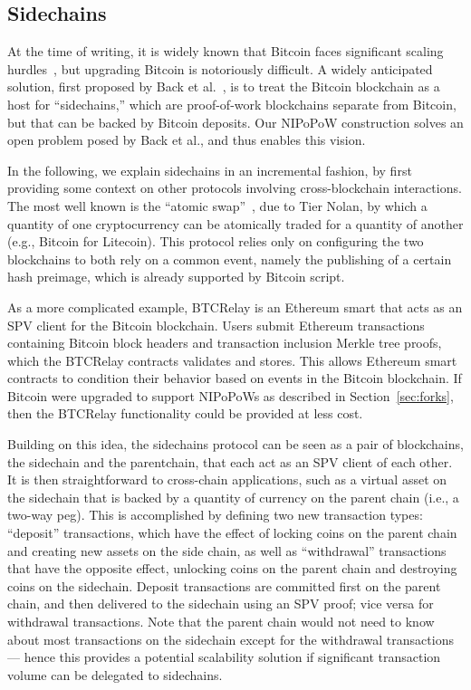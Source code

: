 \subsection{Sidechains}
\label{sec.sidechains}
At the time of writing, it is widely known that Bitcoin faces significant scaling hurdles~\cite{onscaling}, but upgrading Bitcoin is notoriously difficult.
A widely anticipated solution, first proposed by Back et al.~\cite{sidechains}, is to treat the Bitcoin blockchain as a host for ``sidechains,'' which are proof-of-work blockchains separate from Bitcoin, but that can be backed by Bitcoin deposits. Our NIPoPoW construction solves an open problem posed by Back et al., and thus enables this vision.

In the following, we explain sidechains in an incremental fashion, by first providing some context on other protocols involving cross-blockchain interactions. The most well known is the ``atomic swap''~\cite{tiernolan}, due to Tier Nolan, by which a quantity of one cryptocurrency can be atomically traded for a quantity of another (e.g., Bitcoin for Litecoin). This protocol relies only on configuring the two blockchains to both rely on a common event, namely the publishing of a certain hash preimage, which is already supported by Bitcoin script.

As a more complicated example, BTCRelay is an Ethereum \cite{ethereum} smart  that acts as an SPV client for the Bitcoin blockchain.
Users submit Ethereum transactions containing Bitcoin block headers and transaction inclusion Merkle tree proofs, which the BTCRelay contracts validates and stores. This allows Ethereum smart contracts to condition their behavior based on events in the Bitcoin blockchain.
If Bitcoin were upgraded to support NIPoPoWs as described in Section~\ref{sec:forks}, then the BTCRelay functionality could be provided at less cost.

Building on this idea, the sidechains protocol can be seen as a pair of blockchains, the sidechain and the parentchain, that each act as an SPV client of each other.
It is then straightforward to cross-chain applications, such as a virtual asset on the sidechain that is backed by a quantity of currency on the parent chain (i.e., a two-way peg).
This is accomplished by defining two new transaction types: ``deposit'' transactions, which have the effect of locking coins on the parent chain and creating new assets on the side chain, as well as ``withdrawal'' transactions that have the opposite effect, unlocking coins on the parent chain and destroying coins on the sidechain. Deposit transactions are committed first on the parent chain, and then delivered to the sidechain using an SPV proof; vice versa for withdrawal transactions. Note that the parent chain would not need to know about most transactions on the sidechain except for the withdrawal transactions --- hence this provides a potential scalability solution if significant transaction volume can be delegated to sidechains.

